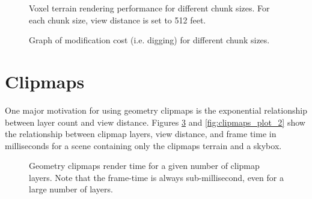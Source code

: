 \begin{figure}
	\centering
{}
	\caption{
		Voxel terrain rendering performance for different chunk sizes.
		For each chunk size, view distance is set to 512 feet.
	}
	\label{fig:voxel_plot_1}
\end{figure}

\begin{figure}
	\centering
{}
	\caption{
		Graph of modification cost (i.e. digging) for different chunk sizes.
	}
	\label{fig:voxel_plot_2}
\end{figure}

\section{Clipmaps}

One major motivation for using geometry clipmaps  is the exponential relationship between layer count and view distance.
Figures \ref{fig:clipmaps_plot_1} and \ref{fig:clipmaps_plot_2} show the relationship between clipmap layers, view distance, and frame time in milliseconds for a scene containing only the clipmaps terrain and a skybox.

\begin{figure}
	\centering
{}
	\caption{
		Geometry clipmaps render time for a given number of clipmap layers.
		Note that the frame-time is always sub-millisecond, even for a large number of layers.
	}
	\label{fig:clipmaps_plot_1}
\end{figure}

